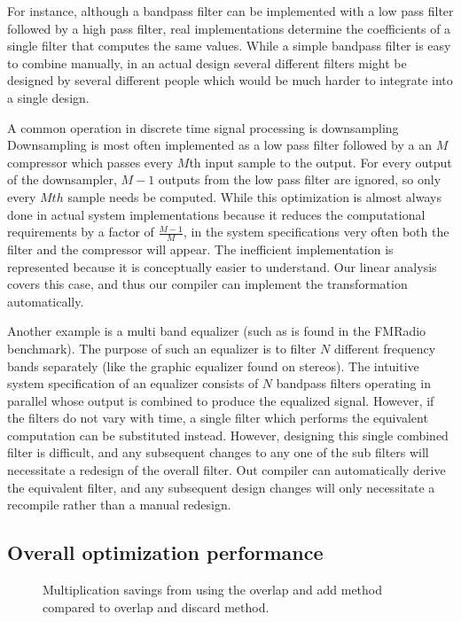 For instance, although a bandpass filter can be implemented with a 
low pass filter followed by a high pass filter, real implementations determine the coefficients 
of a single filter that computes the same values. While a simple bandpass filter is easy to combine
manually, in an actual design several different filters might be designed by 
several different people which would be much harder to integrate into a single design.

A common operation in discrete time signal processing is downsampling
Downsampling is most often implemented as a low pass filter followed by a 
an $M$ compressor which passes every $M$th input sample to the output.
For every output of the downsampler, $M-1$ outputs from the low pass filter
are ignored, so only every $Mth$ sample needs be computed.
While this optimization is almost always done in actual system implementations because it reduces 
the computational requirements by a factor of $\frac{M-1}{M}$, in the system specifications
very often both the filter and the compressor will appear. The inefficient
implementation is represented because it is conceptually easier to understand. 
Our linear analysis covers this case, and thus our compiler can implement the transformation
automatically.

Another example is a multi band equalizer (such as is found in the FMRadio benchmark). 
The purpose of such an equalizer is to filter $N$ different frequency bands 
separately (like the graphic equalizer found on stereos). The intuitive system specification 
of an equalizer consists of $N$ bandpass filters operating in parallel whose output 
is combined to produce the equalized signal. However, if the filters do not vary with time, 
a single filter which performs the equivalent computation can be substituted instead. 
However, designing this single combined filter is difficult, and any subsequent changes to 
any one of the sub filters will necessitate a redesign of the overall filter. 
Out compiler can automatically derive the equivalent filter, and any subsequent design changes
will only necessitate a recompile rather than a manual redesign.


\subsection{Overall optimization performance}

\begin{figure}
\center
\epsfxsize=3.2in
\vspace{-12pt}
\caption{Multiplication savings from using the overlap and add method compared to overlap and discard method.}
\label{fig:overlap-add-savings}
\vspace{-12pt}
\end{figure}

